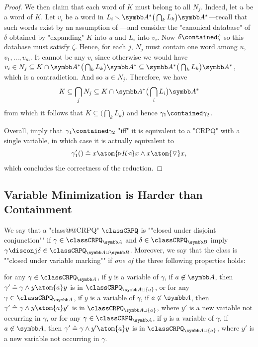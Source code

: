\begin{proof}
	We then claim that each word of $K$ must belong to all $N_j$.
	Indeed, let $u$ be a word of $K$. Let $v_i$ be a word in
	$L_i \smallsetminus \A^* \big(\bigcap_k L_k\big) \A^*$---recall
	that such words exist by an assumption of ---and
	consider the "canonical database" of $\delta$ obtained by "expanding"
	$K$ into $u$ and $L_i$ into $v_i$.
	Now $\delta \contained \zeta$ so this database must satisfy $\zeta$.
	Hence, for each $j$, $N_j$ must contain one word among $u$, $v_1, \dotsc,v_m$.
	It cannot be any $v_i$ since otherwise we would have $v_i \in N_j \subseteq
	K \cap \A^* \big(\bigcap_k L_k\big) \A^* \subseteq \A^* \big(\bigcap_k L_k\big) \A^*$, which is a contradiction. And so $u \in N_j$.
	Therefore, we have
	\[
		K \subseteq \bigcap_j N_j \subseteq K \cap \A^* \big(\bigcap_i L_i\big) \A^*
	\]
	from which it follows that $K \subseteq \big(\bigcap_k L_k\big)$ and hence
	$\gamma_1 \contained \gamma_2$.
	
	Overall,
	imply that $\gamma_1 \contained \gamma_2$ "iff" it is equivalent
	to a "CRPQ" with a single variable, in which case it is actually equivalent to
	\[\gamma'_1() \defeq x \atom{\triangleright K \triangleleft} x
		\land x \atom{\marking} x,\]
	which concludes the correctness of the reduction.
\end{proof}

\subsection{Variable Minimization is Harder than Containment}

We say that a "class@@CRPQ" $\classCRPQ$ is \AP""closed under disjoint conjunction""
if $\gamma \in \classCRPQ_{\A}$ and $\delta \in \classCRPQ_{\B}$
imply $\gamma \disconj \delta \in \classCRPQ_{\A \cup \B}$.
Moreover, we say that the class is \AP""closed under variable marking""
if \emph{one of} the three following properties holds: 
\begin{description}
	\itemAP[\intro*\axiomVarMarkingLoop] for any $\gamma \in \classCRPQ_{\A}$, if $y$ is a variable of $\gamma$,
		if $a\not\in\A$, then $\gamma' \defeq \gamma \land y \atom{a} y$
		is in $\classCRPQ_{\A\sqcup\{a\}}$, or
	\itemAP[\intro*\axiomVarMarkingOut] for any $\gamma \in \classCRPQ_{\A}$, if $y$ is a variable of $\gamma$,	
		if $a\not\in\A$, then $\gamma' \defeq \gamma \land y \atom{a} y'$
		is in $\classCRPQ_{\A\sqcup\{a\}}$,
		where $y'$ is a new variable not occurring in $\gamma$, or
	\itemAP[\intro*\axiomVarMarkingIn] for any $\gamma \in \classCRPQ_{\A}$, if $y$ is a variable of $\gamma$,	
		if $a\not\in\A$, then $\gamma' \defeq \gamma \land y' \atom{a} y$
		is in $\classCRPQ_{\A\sqcup\{a\}}$,
		where $y'$ is a new variable not occurring in $\gamma$.
\end{description}

